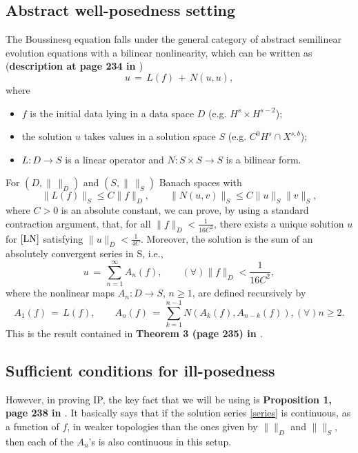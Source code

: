 \documentclass{amsart}
\begin{document}
\subsection{Abstract well-posedness setting} The Boussinesq equation falls under the general category of abstract semilinear evolution equations with a bilinear nonlinearity, which can be written as (\textbf{description at page 234 in \cite{BT06}})
\begin{equation}
u\,=\,L(f)\,+\,N(u,u),
\label{LN}
\end{equation}
where
\begin{itemize}

\item $f$ is the initial data lying in a data space $D$ (e.g. $H^s \times H^{s-2}$);

\item the solution $u$ takes values in a solution space $S$ (e.g. $C^0H^s \cap X^{s,b}$);

\item $L: D \to S$ is a linear operator  and $N:S\times S \to S$ is a bilinear form.  

\end{itemize} 

For $(D,\|\, \|_D)$ and $(S,\|\, \|_S)$ Banach spaces with 
\begin{equation}
\|L(f)\|_S \leq C \|f\|_D,\qquad \|N(u,v)\|_S \leq C \|u\|_S \|v\|_S,
\label{estim}
\end{equation}
where $C>0$ is an absolute constant, we can prove, by using a standard contraction argument, that, for all  $\|f\|_D<\frac{1}{16C^2}$, there exists a unique solution $u$ for $\eqref{LN}$ satisfying $\|u\|_D<\frac{1}{4C}$.  Moreover, the solution is the sum of an absolutely convergent series in S, i.e.,
\begin{equation}
u\,=\,\sum_{n=1}^{\infty} A_n(f), \qquad (\forall) \|f\|_D<\frac{1}{16C^2},
\label{series}
\end{equation}
where the nonlinear maps $A_n: D\to S$, $n\geq 1$, are defined recursively by
\begin{equation}
A_1(f)\,=\,L(f), \qquad A_n(f)\,=\,\sum_{k=1}^{n-1} N(A_k(f),A_{n-k}(f)), (\forall)n\geq 2.
\label{An}
\end{equation}
This is the result contained in \textbf{Theorem 3 (page 235) in \cite{BT06}}.

\subsection{Sufficient conditions for ill-posedness} However, in proving IP, the key fact that we will be using is \textbf{Proposition 1, page 238 in \cite{BT06}}. It basically says that if the solution series \eqref{series} is continuous, as a function of $f$, in  weaker topologies than the ones given by $\| \|_D$ and $\| \|_S$, then each of the $A_n$'s is also continuous in this setup.
\end{document}
